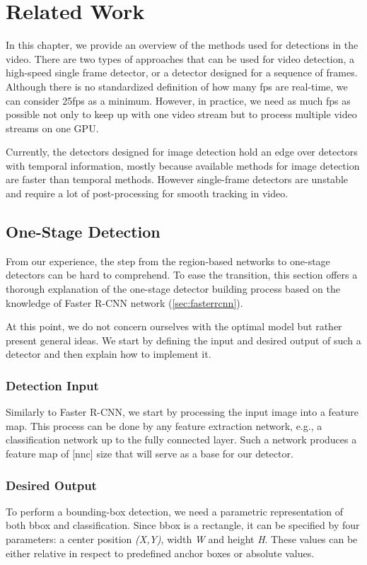\chapter{Related Work}
\label{chap:related}

In this chapter, we provide an overview of the methods used for detections in the video. There are two types of approaches that can be used for video detection, a high-speed single frame detector, or a detector designed for a sequence of frames. Although there is no standardized definition of how many fps are real-time, we can consider 25fps as a minimum. However, in practice, we need as much fps as possible not only to keep up with one video stream but to process multiple video streams on one GPU. 

Currently, the detectors designed for image detection hold an edge over detectors with temporal information, mostly because available methods for image detection are faster than temporal methods. However single-frame detectors are unstable and require a lot of post-processing for smooth tracking in video. 

\section{One-Stage Detection}
From our experience, the step from the region-based networks to one-stage detectors can be hard to comprehend. To ease the transition, this section offers a thorough explanation of the one-stage detector building process based on the knowledge of Faster R-CNN network (\cref{sec:fasterrcnn}). 

At this point, we do not concern ourselves with the optimal model but rather present general ideas. We start by defining the input and desired output of such a detector and then explain how to implement it.

\subsection*{Detection Input}
Similarly to Faster R-CNN, we start by processing the input image into a feature map. This process can be done by any feature extraction network, e.g., a classification network up to the fully connected layer. Such a network produces a feature map of [n\x n\x c] size that will serve as a base for our detector.

\subsection*{Desired Output}
To perform a bounding-box detection, we need a parametric representation of both bbox and classification. Since bbox is a rectangle, it can be specified by four parameters: a center position \textit{(X,Y)}, width \textit{W} and height \textit{H}. These values can be either relative in respect to predefined anchor boxes or absolute values.

